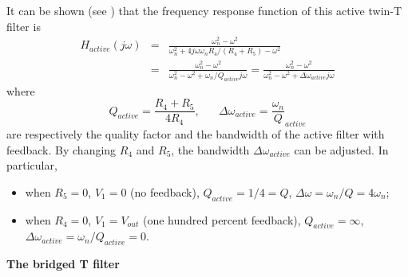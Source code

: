 \documentclass{article}
\begin{document}
It can be shown (see )
that the frequency response function of this active twin-T filter is
\begin{eqnarray}
H_{active}(j\omega)
&=&\frac{\omega_n^2-\omega^2}{\omega_n^2+4j\omega\omega_n R_4/(R_4+R_5)-\omega^2}
\nonumber\\
&=&\frac{\omega_n^2-\omega^2}{\omega_n^2-\omega^2+\omega_n/Q_{active} j\omega}
=\frac{\omega_n^2-\omega^2}{\omega_n^2-\omega^2+\Delta\omega_{active} j\omega}
\end{eqnarray}
where 
\begin{equation}
Q_{active}=\frac{R_4+R_5}{4R_4},\;\;\;\;\;\;
\Delta\omega_{active}=\frac{\omega_n}{Q}_{active}
\end{equation}
are respectively the quality factor and the bandwidth of the active 
filter with feedback. By changing $R_4$ and $R_5$, the bandwidth 
$\Delta\omega_{active}$ can be adjusted. In particular, 
\begin{itemize}
\item when $R_5=0$, $V_1=0$ (no feedback), $Q_{active}=1/4=Q$, 
  $\Delta\omega=\omega_n/Q=4\omega_n$; 
\item when $R_4=0$, $V_1=V_{out}$ (one hundred percent feedback), 
  $Q_{active}=\infty$, $\Delta\omega_{active}=\omega_n/Q_{active}=0$.
\end{itemize}


{\bf The bridged T filter}
\end{document}
